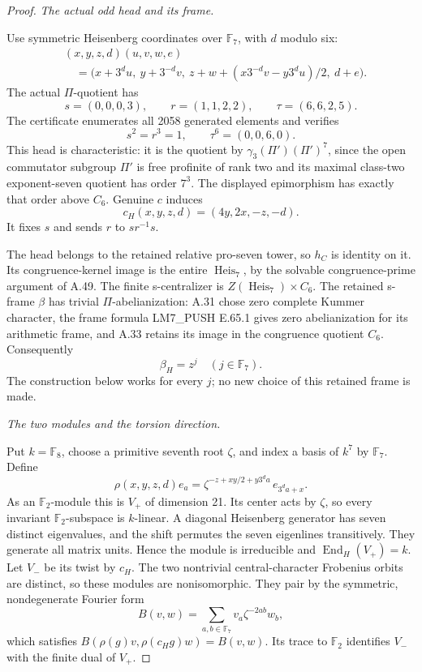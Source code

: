 \begin{proof}
\emph{The actual odd head and its frame.}\par
Use symmetric Heisenberg coordinates over
\(\mathbb F_7\), with \(d\) modulo six:
\[
 \begin{aligned}
 &(x,y,z,d)(u,v,w,e)\\
 &\quad=\bigl(x+3^du,\ y+3^{-d}v,\
 z+w+(x3^{-d}v-y3^du)/2,\ d+e\bigr).
 \end{aligned}
\]
The actual \(\Pi\)-quotient has
\[
 s=(0,0,0,3),\qquad r=(1,1,2,2),
 \qquad\tau=(6,6,2,5).
 \tag{A.50.1}
\]
The certificate 
enumerates all 2058 generated elements and
verifies
\[
                 s^2=r^3=1,
 \qquad \tau^6=(0,0,6,0).
\]
This head is characteristic: it is the quotient
by \(\gamma_3(\Pi')(\Pi')^7\), since the
open commutator subgroup \(\Pi'\) is free
profinite of rank two and its maximal
class-two exponent-seven quotient has order
\(7^3\). The displayed epimorphism has exactly
that order above \(C_6\).
Genuine \(c\) induces
\[
                 c_H(x,y,z,d)=(4y,2x,-z,-d).
 \tag{A.50.2}
\]
It fixes \(s\) and sends \(r\) to \(sr^{-1}s\).

The head belongs to the retained relative
pro-seven tower, so \(h_C\) is identity on
it. Its congruence-kernel image is the entire
\(\operatorname{Heis}_7\), by the solvable
congruence-prime argument of A.49. The finite
s-centralizer is
\(Z(\operatorname{Heis}_7)\times C_6\).
The retained s-frame \(\beta\) has trivial
\(\Pi\)-abelianization: A.31 chose zero complete
Kummer character, the frame formula
LM7\_PUSH E.65.1 gives zero abelianization
for its arithmetic frame, and A.33 retains
its image in the congruence quotient \(C_6\).
Consequently
\[
                           \beta_H=z^j
                         \quad(j\in\mathbb F_7).
 \tag{A.50.3}
\]
The construction below works for every \(j\);
no new choice of this retained frame is made.

\emph{The two modules and the torsion direction.}\par
Put \(k=\mathbb F_8\), choose a primitive
seventh root \(\zeta\), and index a basis
of \(k^7\) by \(\mathbb F_7\). Define
\[
 \rho(x,y,z,d)e_a
  =\zeta^{-z+xy/2+y3^da}\,e_{3^da+x}.
 \tag{A.50.4}
\]
As an \(\mathbb F_2\)-module this is \(V_+\)
of dimension 21. Its center acts by \(\zeta\),
so every invariant \(\mathbb F_2\)-subspace
is \(k\)-linear. A diagonal Heisenberg generator
has seven distinct eigenvalues, and the shift
permutes the seven eigenlines transitively.
They generate all matrix units. Hence the
module is irreducible and
\(\operatorname{End}_H(V_+)=k\).
Let \(V_-\) be its twist by \(c_H\).
The two nontrivial central-character Frobenius
orbits are distinct, so these modules are
nonisomorphic. They pair by the symmetric,
nondegenerate Fourier form
\[
                 B(v,w)=\sum_{a,b\in\mathbb F_7}
                                  v_a\zeta^{-2ab}w_b,
 \tag{A.50.5}
\]
which satisfies
\(B(\rho(g)v,\rho(c_Hg)w)=B(v,w)\).
Its trace to \(\mathbb F_2\) identifies
\(V_-\) with the finite dual of \(V_+\).


\end{proof}
